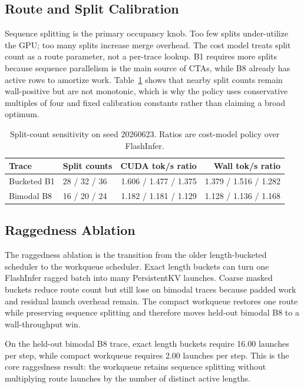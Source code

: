 \documentclass[10pt]{article}
\begin{document}
\subsection{Route and Split Calibration}

Sequence splitting is the primary occupancy knob. Too few splits under-utilize
the GPU; too many splits increase merge overhead. The cost model treats split
count as a route parameter, not a per-trace lookup. B1 requires more splits
because sequence parallelism is the main source of CTAs, while B8 already has
active rows to amortize work. Table~\ref{tab:split} shows that nearby split
counts remain wall-positive but are not monotonic, which is why the policy uses
conservative multiples of four and fixed calibration constants rather than
claiming a broad optimum.

\begin{table}[t]
\centering
\caption{Split-count sensitivity on seed 20260623. Ratios are cost-model policy
over FlashInfer.}
\label{tab:split}
\small
\begin{tabular}{llrr}
\toprule
Trace & Split counts & CUDA tok/s ratio & Wall tok/s ratio \\
\midrule
Bucketed B1 & 28 / 32 / 36 & 1.606 / 1.477 / 1.375 & 1.379 / 1.516 / 1.282 \\
Bimodal B8 & 16 / 20 / 24 & 1.182 / 1.181 / 1.129 & 1.128 / 1.136 / 1.168 \\
\bottomrule
\end{tabular}
\end{table}

\subsection{Raggedness Ablation}

The raggedness ablation is the transition from the older length-bucketed
scheduler to the workqueue scheduler. Exact length buckets can turn one
FlashInfer ragged batch into many PersistentKV launches. Coarse masked buckets
reduce route count but still lose on bimodal traces because padded work and
residual launch overhead remain. The compact workqueue restores one route while
preserving sequence splitting and therefore moves held-out bimodal B8 to a
wall-throughput win.

On the held-out bimodal B8 trace, exact length buckets require 16.00 launches
per step, while compact workqueue requires 2.00 launches per step. This is the
core raggedness result: the workqueue retains sequence splitting without
multiplying route launches by the number of distinct active lengths.
\end{document}
